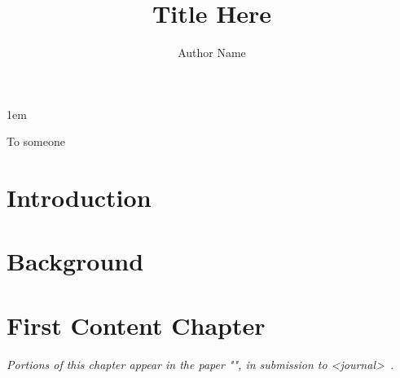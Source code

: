 \documentclass[tocnosub,noragright,centerchapter,fullpagesingle,12pt]{uiuc_csthesis18}
\title{Title Here}
\author{Author Name}
\begin{document}
%

%
\maketitle

\parindent 1em%

\frontmatter

%
\begin{abstract}
%
\end{abstract}


%
\begin{dedication}
To someone
\end{dedication}

%
\begin{acknowledgments}
%
\end{acknowledgments}

%
\tableofcontents

\mainmatter

%

\chapter{Introduction}
%

\chapter{Background} \label{chapter:background}
%

\chapter{First Content Chapter} \label{chapter:content1}
\emph{Portions of this chapter appear in the paper "", in submission to
<journal>~\cite{citation}.}
%
\end{document}
